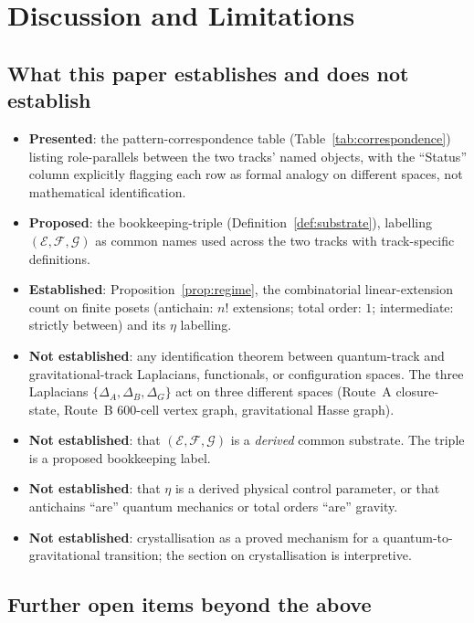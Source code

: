 \documentclass[12pt]{article}
\newcommand{\Ecal}{\mathcal{E}}
\newcommand{\Gcal}{\mathcal{G}}
\newcommand{\Fcal}{\mathcal{F}}
\begin{document}
\section{Discussion and Limitations}\label{sec:discussion}

\subsection{What this paper establishes and does not establish}

\begin{itemize}
    \item \textbf{Presented}: the pattern-correspondence table (Table~\ref{tab:correspondence}) listing role-parallels between the two tracks' named objects, with the ``Status'' column explicitly flagging each row as formal analogy on different spaces, not mathematical identification.
    \item \textbf{Proposed}: the bookkeeping-triple (Definition~\ref{def:substrate}), labelling $(\Ecal, \Fcal, \Gcal)$ as common names used across the two tracks with track-specific definitions.
    \item \textbf{Established}: Proposition~\ref{prop:regime}, the combinatorial linear-extension count on finite posets (antichain: $n!$ extensions; total order: $1$; intermediate: strictly between) and its $\eta$ labelling.
    \item \textbf{Not established}: any identification theorem between quantum-track and gravitational-track Laplacians, functionals, or configuration spaces. The three Laplacians $\{\Delta_A, \Delta_B, \Delta_G\}$ act on three different spaces (Route~A closure-state, Route~B 600-cell vertex graph, gravitational Hasse graph).
    \item \textbf{Not established}: that $(\Ecal, \Fcal, \Gcal)$ is a \emph{derived} common substrate. The triple is a proposed bookkeeping label.
    \item \textbf{Not established}: that $\eta$ is a derived physical control parameter, or that antichains ``are'' quantum mechanics or total orders ``are'' gravity.
    \item \textbf{Not established}: crystallisation as a proved mechanism for a quantum-to-gravitational transition; the section on crystallisation is interpretive.
\end{itemize}

\subsection{Further open items beyond the above}
\end{document}
